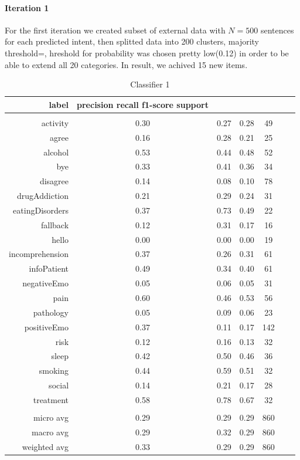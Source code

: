 \documentclass[11pt]{article}
\begin{document}
{\paragraph{Iteration 1} For the first iteration we created subset of external data with $N=500$ sentences for each predicted intent, then splitted data into 200 clusters, majority threshold=, hreshold for probability was chosen pretty low(0.12) in order to be able to extend all 20 categories. In result, we achived 15 new items.

\begin{table}[htb]
\begin{center}
\begin{tabular}{ |r|c|c|c|c|c|c| }
label & precision    recall  f1-score   support\\ \hline 
\\ \hline 
activity &  0.30 & 0.27 & 0.28 &   49\\ \hline 
agree &  0.16 & 0.28 & 0.21 &   25\\ \hline 
alcohol &  0.53 & 0.44 & 0.48 &   52\\ \hline 
bye &  0.33 & 0.41 & 0.36 &   34\\ \hline 
disagree &  0.14 & 0.08 & 0.10 &   78\\ \hline 
drugAddiction &  0.21 & 0.29 & 0.24 &   31\\ \hline 
eatingDisorders &  0.37 & 0.73 & 0.49 &   22\\ \hline 
fallback &  0.12 & 0.31 & 0.17 &   16\\ \hline 
hello &  0.00 & 0.00 & 0.00 &   19\\ \hline 
incomprehension &  0.37 & 0.26 & 0.31 &   61\\ \hline 
infoPatient &  0.49 & 0.34 & 0.40 &   61\\ \hline 
negativeEmo &  0.05 & 0.06 & 0.05 &   31\\ \hline 
pain &  0.60 & 0.46 & 0.53 &   56\\ \hline 
pathology &  0.05 & 0.09 & 0.06 &   23\\ \hline 
positiveEmo &  0.37 & 0.11 & 0.17 &  142\\ \hline 
risk &  0.12 & 0.16 & 0.13 &   32\\ \hline 
sleep &  0.42 & 0.50 & 0.46 &   36\\ \hline 
smoking &  0.44 & 0.59 & 0.51 &   32\\ \hline 
social &  0.14 & 0.21 & 0.17 &   28\\ \hline 
treatment &  0.58 & 0.78 & 0.67 &   32\\ \hline 
\\ \hline 
micro avg &  0.29 & 0.29 & 0.29 &  860\\ \hline 
macro avg &  0.29 & 0.32 & 0.29 &  860\\ \hline 
weighted avg &  0.33 & 0.29 & 0.29 &  860\\ \hline
\end{tabular}
\caption{Classifier 1}
\end{center}
\end{table}
\FloatBarrier

}
\end{document}
